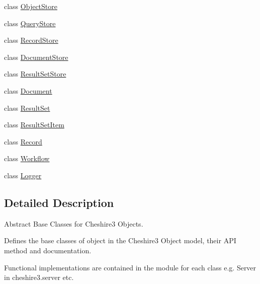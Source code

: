 \begin{DoxyCompactItemize}
class \hyperlink{classcheshire3_1_1base_objects_1_1_object_store}{Object\-Store}
\item 
class \hyperlink{classcheshire3_1_1base_objects_1_1_query_store}{Query\-Store}
\item 
class \hyperlink{classcheshire3_1_1base_objects_1_1_record_store}{Record\-Store}
\item 
class \hyperlink{classcheshire3_1_1base_objects_1_1_document_store}{Document\-Store}
\item 
class \hyperlink{classcheshire3_1_1base_objects_1_1_result_set_store}{Result\-Set\-Store}
\item 
class \hyperlink{classcheshire3_1_1base_objects_1_1_document}{Document}
\item 
class \hyperlink{classcheshire3_1_1base_objects_1_1_result_set}{Result\-Set}
\item 
class \hyperlink{classcheshire3_1_1base_objects_1_1_result_set_item}{Result\-Set\-Item}
\item 
class \hyperlink{classcheshire3_1_1base_objects_1_1_record}{Record}
\item 
class \hyperlink{classcheshire3_1_1base_objects_1_1_workflow}{Workflow}
\item 
class \hyperlink{classcheshire3_1_1base_objects_1_1_logger}{Logger}
\end{DoxyCompactItemize}


\subsection{Detailed Description}
\begin{DoxyVerb}Abstract Base Classes for Cheshire3 Objects.

Defines the base classes of object in the Cheshire3 Object model, their
API method and documentation.

Functional implementations are contained in the module for each class e.g.
Server in cheshire3.server etc.
\end{DoxyVerb}
 